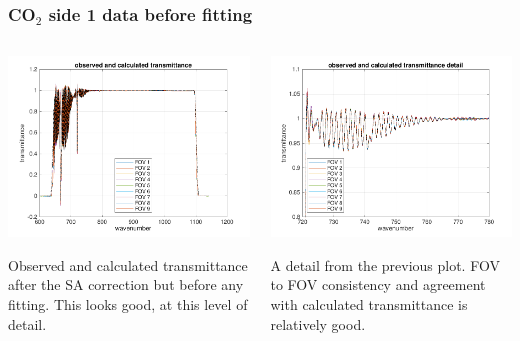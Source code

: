 \documentclass[10pt]{beamer}
\begin{document}
\begin{frame}
\frametitle{CO$_2$ side 1 data before fitting}
\begin{columns}[t]
\begin{column}{0.5\textwidth}  
  \begin{centering}
  \includegraphics[width=\textwidth]{01-07_pfl_s1_CO2/spec_test2_all.png}
  \end{centering}\vspace{3mm}

Observed and calculated transmittance after the SA correction but
before any fitting.  This looks good, at this level of detail.

\end{column}

\begin{column}{0.5\textwidth}
  \begin{centering}
  \includegraphics[width=\textwidth]{01-07_pfl_s1_CO2/spec_test2_zoom.png}
  \end{centering}\vspace{3mm}

A detail from the previous plot.  FOV to FOV consistency and
agreement with calculated transmittance is relatively good.

\end{column}
\end{columns}
\end{frame}
\end{document}
